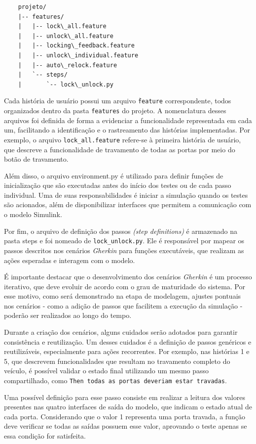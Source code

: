 \begin{verbatim}
    projeto/
    |-- features/
    |   |-- lock\_all.feature
    |   |-- unlock\_all.feature
    |   |-- locking\_feedback.feature
    |   |-- unlock\_individual.feature
    |   |-- auto\_relock.feature
    |   `-- steps/
    |       `-- lock\_unlock.py
\end{verbatim}

Cada história de usuário possui um arquivo \texttt{\.feature} correspondente, todos organizados dentro da pasta \texttt{features} do projeto. A nomenclatura desses 
arquivos foi definida de forma a evidenciar a funcionalidade representada em cada um, facilitando a identificação e o rastreamento das histórias implementadas. 
Por exemplo, o arquivo \texttt{lock\_all.feature} refere-se à primeira história de usuário, que descreve a funcionalidade de travamento de todas as portas 
por meio do botão de travamento.

Além disso, o arquivo environment.py é utilizado para definir funções de inicialização que são executadas antes do início dos testes ou de cada passo individual. 
Uma de suas responsabilidades é iniciar a simulação quando os testes são acionados, além de disponibilizar interfaces que permitem a comunicação com o modelo Simulink.

Por fim, o arquivo de definição dos passos \textit{(step definitions)} é armazenado na pasta steps e foi nomeado de \texttt{lock\_unlock.py}. Ele é responsável por mapear os 
passos descritos nos cenários \textit{Gherkin} para funções executáveis, que realizam as ações esperadas e interagem com o modelo.

É importante destacar que o desenvolvimento dos cenários \textit{Gherkin} é um processo iterativo, que deve evoluir de acordo com o grau de maturidade do sistema. 
Por esse motivo, como será demonstrado na etapa de modelagem, ajustes pontuais nos cenários - como a adição de passos que facilitem a execução da simulação - 
poderão ser realizados ao longo do tempo.

Durante a criação dos cenários, alguns cuidados serão adotados para garantir consistência e reutilização. Um desses cuidados é a definição de passos genéricos 
e reutilizáveis, especialmente para ações recorrentes. Por exemplo, nas histórias 1 e 5, que descrevem funcionalidades que resultam no travamento completo do 
veículo, é possível validar o estado final utilizando um mesmo passo compartilhado, como \texttt{Then todas as portas deveriam estar travadas}.

Uma possível definição para esse passo consiste em realizar a leitura dos valores presentes nas quatro interfaces de saída do modelo, que indicam o estado atual 
de cada porta. Considerando que o valor 1 representa uma porta travada, a função deve verificar se todas as saídas possuem esse valor, aprovando o teste apenas se 
essa condição for satisfeita.

